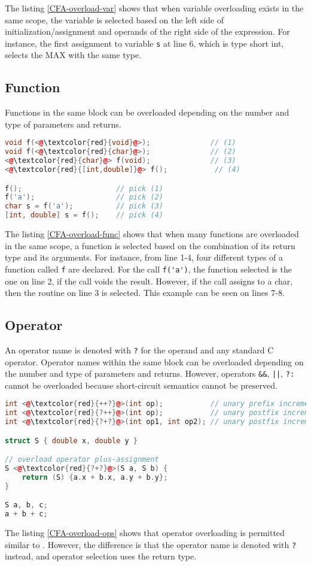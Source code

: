 The listing \ref{CFA-overload-var} shows that when variable overloading exists
in the same scope, the variable is selected based on the left side of
initialization/assignment and operands of the right side of the expression. For
instance, the first assignment to variable \verb|s| at line 6, which is type short int,
selects the MAX with the same type.

\subsection{Function}
Functions in the same block can be overloaded depending on the number and type of
parameters and returns.

\begin{lstlisting}[language=C++, caption={Overloading routines in \CFA},
label={CFA-overload-func}]
void f(<@\textcolor{red}{void}@>);              // (1)
void f(<@\textcolor{red}{char}@>);              // (2)
<@\textcolor{red}{char}@> f(void);              // (3)
<@\textcolor{red}{[int,double]}@> f();           // (4)

f();                      // pick (1)
f('a');                   // pick (2)
char s = f('a');          // pick (3)
[int, double] s = f();    // pick (4)
\end{lstlisting}

The listing \ref{CFA-overload-func} shows that when many functions are overloaded in
the same scope, a function is selected based on the combination of its return type and its
arguments. For instance, from line 1-4, four different types of a function called
\verb|f| are declared. For the call \verb|f('a')|, the function selected is the
one on line 2, if the call voids the result. However, if the call assigns to a
char, then the routine on line 3 is selected. This example can be seen on lines
7-8.

\subsection{Operator}
An operator name is denoted with \verb|?| for the operand and any standard C
operator. Operator names within the same block can be overloaded depending on
the number and type of parameters and returns. However, operators \verb|&&|,
\verb-||-, \verb|?:| cannot be overloaded because short-circuit semantics
cannot be preserved.


\begin{lstlisting}[language=C++, caption={Overloading operators in \CFA},
label={CFA-overload-ops}]
int <@\textcolor{red}{++?}@>(int op);           // unary prefix increment
int <@\textcolor{red}{?++}@>(int op);           // unary postfix increment
int <@\textcolor{red}{?+?}@>(int op1, int op2); // unary postfix increment

struct S { double x, double y }

// overload operator plus-assignment
S <@\textcolor{red}{?+?}@>(S a, S b) {
    return (S) {a.x + b.x, a.y + b.y};
}

S a, b, c;
a + b + c;
\end{lstlisting}

The listing \ref{CFA-overload-ops} shows that operator overloading is permitted
similar to \CC. However, the difference is that the operator name is
denoted with \verb|?| instead, and operator selection uses the return type.
